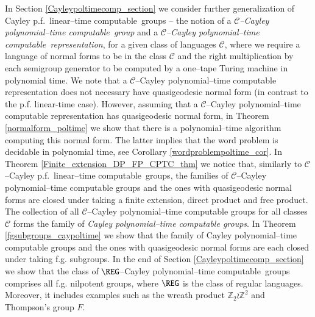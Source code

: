 \documentclass[article,12pt]{elsarticle}
\newcommand\ClinearC{$\mathcal{C}$--Cayley p.f.~linear--time computable}
\newcommand\linearC{Cayley p.f.~linear--time computable}
\newcommand\CpolyC{$\mathcal{C}$--Cayley polynomial--time computable}
\newcommand\polyC{Cayley polynomial--time computable}
\begin{document}
In Section \ref{Cayleypoltimecomp_section} 
we consider further generalization of 
\linearC\ 
 groups --   
the notion of a \emph{\CpolyC\
group} and a 
\emph{\CpolyC\
representation}, 
for a given class of languages $\mathcal{C}$, where 
we require a language of normal forms to be in the 
class $\mathcal{C}$ and the right multiplication 
by each semigroup generator to be computed 
by a 
one--tape Turing machine
in polynomial time.  
We note that a $\mathcal{C}$--Cayley 
polynomial--time computable representation 
does not necessary have quasigeodesic normal 
form (in contrast  to the p.f. linear-time case). 
However, assuming that a 
$\mathcal{C}$--Cayley polynomial--time 
computable representation has quasigeodesic 
normal form, in Theorem \ref{normalform_poltime} 
we show that there is a 
polynomial--time algorithm computing this normal 
form. The latter implies that the word problem is 
decidable in polynomial time, see Corollary \ref{wordproblempoltime_cor}. 
In Theorem \ref{Finite_extension_DP_FP_CPTC_thm}  
we notice that, similarly to 
\ClinearC\ 
groups, the families of 
$\mathcal{C}$--Cayley polynomial--time 
computable groups and the ones 
with quasigeodesic 
normal forms are closed 
under taking a finite extension, direct product 
and free product. 
The collection of all $\mathcal{C}$--Cayley 
polynomial--time computable groups for all classes
$\mathcal{C}$ forms the family of \emph{Cayley 
polynomial--time computable groups}. 
In Theorem \ref{fgsubgroups_caypoltime}
we show that the family of Cayley 
polynomial--time computable groups 
and the ones 
with quasigeodesic 
normal forms  are each
closed under taking f.g.
subgroups. 
In the end of Section \ref{Cayleypoltimecomp_section}
we show that the class of 
$\REG$--\polyC\ groups comprises all 
f.g. nilpotent groups, 
where $\REG$ is the class of regular languages. 
Moreover, it includes  examples 
such as the wreath product 
$\mathbb{Z}_2 \wr \mathbb{Z}^2$ and Thompson's 
group $F$. 
\end{document}
